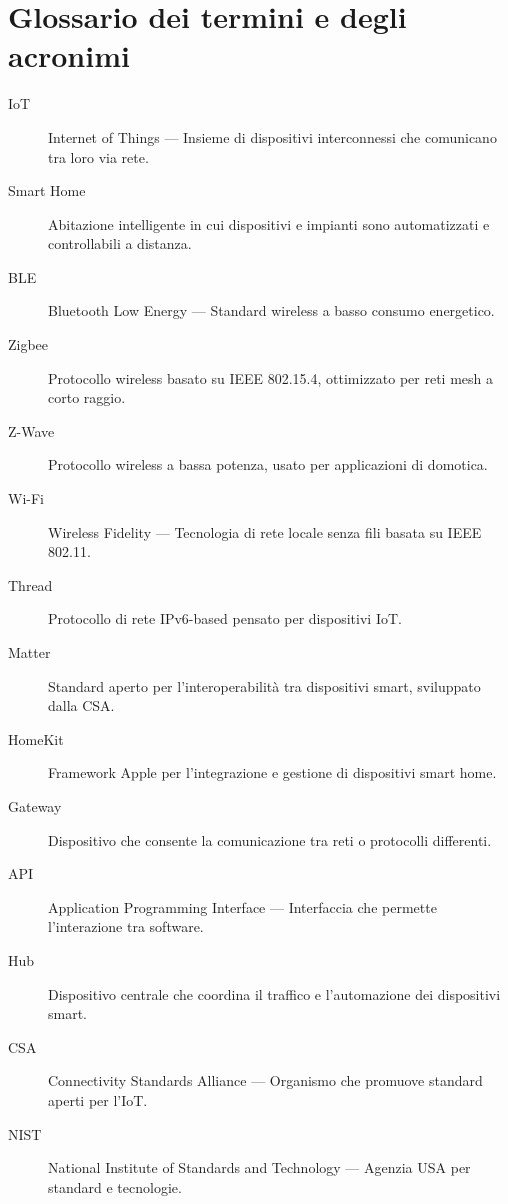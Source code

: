 \chapter{Glossario dei termini e degli acronimi}
\begin{description}
    \item[IoT] Internet of Things — Insieme di dispositivi interconnessi che comunicano tra loro via rete.
    \item[Smart Home] Abitazione intelligente in cui dispositivi e impianti sono automatizzati e controllabili a distanza.
    \item[BLE] Bluetooth Low Energy — Standard wireless a basso consumo energetico.
    \item[Zigbee] Protocollo wireless basato su IEEE 802.15.4, ottimizzato per reti mesh a corto raggio.
    \item[Z-Wave] Protocollo wireless a bassa potenza, usato per applicazioni di domotica.
    \item[Wi-Fi] Wireless Fidelity — Tecnologia di rete locale senza fili basata su IEEE 802.11.
    \item[Thread] Protocollo di rete IPv6-based pensato per dispositivi IoT.
    \item[Matter] Standard aperto per l’interoperabilità tra dispositivi smart, sviluppato dalla CSA.
    \item[HomeKit] Framework Apple per l’integrazione e gestione di dispositivi smart home.
    \item[Gateway] Dispositivo che consente la comunicazione tra reti o protocolli differenti.
    \item[API] Application Programming Interface — Interfaccia che permette l’interazione tra software.
    \item[Hub] Dispositivo centrale che coordina il traffico e l’automazione dei dispositivi smart.
    \item[CSA] Connectivity Standards Alliance — Organismo che promuove standard aperti per l’IoT.
    \item[NIST] National Institute of Standards and Technology — Agenzia USA per standard e tecnologie.
\end{description}